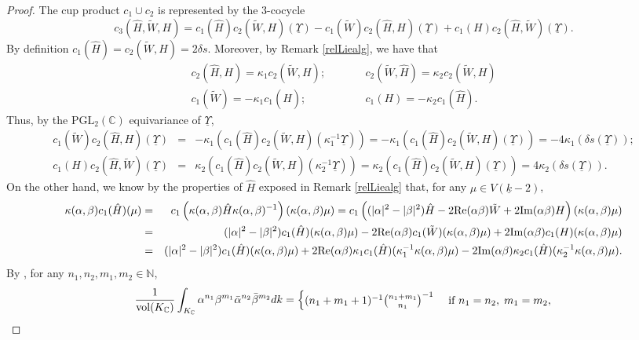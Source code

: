 \documentclass{amsart}
\theoremstyle{definition}
\theoremstyle{remark}
\numberwithin{equation}{section}
\newcommand{\PGL}{{\mathrm{PGL}}}
\newcommand{\C}{{\mathbb C}}
\newcommand{\N}{{\mathbb N}}
\begin{document}
\begin{proof}
    The cup product $c_1\cup c_2$ is represented by the 3-cocycle
    \[
    c_3(\hat H,\tilde W,H)=c_1(\hat H)c_2(\tilde W,H)(\underline{\Upsilon})-c_1(\tilde W)c_2(\hat H,H)(\underline{\Upsilon})+c_1(H)c_2(\hat H,\tilde W)(\underline{\Upsilon}).
    \]
    By definition $c_1(\hat H)=c_2(\tilde W,H)=2\delta s$. Moreover, by Remark \ref{relLiealg}, we have that 
    \begin{eqnarray*}
        c_2(\hat H,H)=\kappa_1 c_2(\tilde W,H);&\qquad& c_2(\tilde W,\hat H)=\kappa_2 c_2(\tilde W,H)\\
        c_1(\tilde W)=-\kappa_1c_1(\hat H);&\qquad& c_1(H)=-\kappa_2c_1(\hat H).
    \end{eqnarray*}
Thus, by the $\PGL_2(\C)$ equivariance of $\underline\Upsilon$,
\begin{eqnarray*}
    c_1(\tilde W)c_2(\hat H,H)(\underline{\Upsilon})&=&-\kappa_1\left(c_1(\hat H)c_2(\tilde W,H)(\kappa_1^{-1}\underline{\Upsilon})\right)=-\kappa_1\left(c_1(\hat H)c_2(\tilde W,H)(\underline{\Upsilon})\right)=-4\kappa_1(\delta s(\underline{\Upsilon}));\\
    c_1(H)c_2(\hat H,\tilde W)(\underline{\Upsilon})&=&\kappa_2\left(c_1(\hat H)c_2(\tilde W,H)(\kappa_2^{-1}\underline{\Upsilon})\right)=\kappa_2\left(c_1(\hat H)c_2(\tilde W,H)(\underline{\Upsilon})\right)=4\kappa_2(\delta s(\underline{\Upsilon})).
\end{eqnarray*}
 On the other hand, we know by the properties of $\hat H$ exposed in Remark \ref{relLiealg} that, for any $\mu\in V(\underline k-2)$,
\begin{eqnarray*}
\kappa(\alpha,\beta)c_1(\hat H)(\mu)&=&c_1\left(\kappa(\alpha,\beta)\hat H\kappa(\alpha,\beta)^{-1}\right)(\kappa(\alpha,\beta) \mu)=c_1\left((|\alpha|^2-|\beta|^2)\hat H-2{\rm Re}(\alpha\beta)\tilde W+2{\rm Im}(\alpha\beta)H\right)(\kappa(\alpha,\beta) \mu)\\
&=&(|\alpha|^2-|\beta|^2)c_1(\hat H)(\kappa(\alpha,\beta) \mu)-2{\rm Re}(\alpha\beta)c_1(\tilde W)(\kappa(\alpha,\beta) \mu)+2{\rm Im}(\alpha\beta)c_1(H)(\kappa(\alpha,\beta) \mu)\\
&=&(|\alpha|^2-|\beta|^2)c_1(\hat H)(\kappa(\alpha,\beta) \mu)+2{\rm Re}(\alpha\beta)\kappa_1c_1(\hat H)(\kappa_1^{-1}\kappa(\alpha,\beta) \mu)-2{\rm Im}(\alpha\beta)\kappa_2c_1(\hat H)(\kappa_2^{-1}\kappa(\alpha,\beta) \mu).
\end{eqnarray*}
By \cite[lemma 4.15]{preprintsanti2}, for any $n_1,n_2,m_1,m_2\in\N$,
\[
\frac{1}{{\rm vol}(K_\C)}\int_{K_\C}\alpha^{n_1}\beta^{m_1}\bar \alpha^{n_2}\bar \beta^{m_2}dk=\begin{cases}(n_1+m_1+1)^{-1}\binom{n_1+m_1}{n_1}^{-1}&\text{ if }n_1=n_2,\;m_1=m_2,\\

\end{cases}\]
\end{proof}
\end{document}

